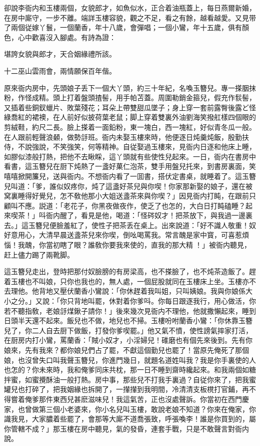 卻說李衙内和玉樓兩個，女貌郎才，如魚似水，正合着油瓶蓋上，每日燕爾新婚，在房中廝守，一步不離。端詳玉樓容貌，觀之不足，看之有餘，越看越愛。又見带了兩個従嫁丫鬟，一個蘭香，年十八歲，會彈唱；一個小鸞，年十五歲，俱有顏色，心中歡喜沒入腳處。有詩為證：

\begin{myquote}
堪誇女貌與郎才，天合姻緣禮所該。

十二巫山雲雨會，兩情願保百年偕。
\end{myquote}

原來衙内房中，先頭娘子丢下一個大丫頭，約三十年紀，名喚玉簪兒。專一搽胭抹粉，作怪成精。頭上打着盤頭揸髻，用手帕苫蓋。周圍勒銷金箍兒，假充作䯼髻，又插着些銅釵蠟片、敗葉殘花；耳朵上帶雙甜瓜墜子；身上穿一套前露臀後露ど怪綠喬紅的裙襖，在人前好似披荷葉老鼠；脚上穿着雙裏外油劉海笑撥舡樣四個眼的剪絨鞋，約尺二長。臉上搽着一面鉛粉，東一塊白，西一塊紅，好似青冬瓜一般。在人跟前輕聲浪顙，做勢㧱班。衙内未娶玉樓來時，他便逐日炖羹炖飯，殷勤扶侍，不說強說，不笑強笑，何等精神。自従娶過玉樓來，見衙内日逐和他床上睡，如膠似漆般打熱，把他不去瞅睬，這丫頭就有些使性兒起來。一日，衙内在書房中看書，這玉簪兒在厨下炖熱了一盞好菓仁泡茶，雙手用盤兒托來，到書房裏面，笑嘻嘻掀開簾兒，送與衙内。不想衙内看了一囬書，搭伏定書桌，就睡着了。這玉簪兒叫道：「爹，誰似奴疼你，炖了這盞好茶兒與你喫！你家那新娶的娘子，還在被窝裏睡得好覺兒，怎不敎他那小大姐送盞茶來與你喫？」因見衙内打盹，在跟前只顧叫不應。説道：「老花子，你黑夜做夜作，使乏了也怎的，大白日打盹磕睡？起來喫茶！」呌衙内醒了，看見是他，喝道：「怪硶奴才！把茶放下，與我過一邊裏去。」這玉簪兒便臉羞紅了，使性子把茶丢在桌上。出來說道：「好不識人敬重！奴好意用心，大清早晨送盞茶兒來你喫，倒吆喝罵我。常言醜是家中寳，可喜惹煩惱！我醜，你當初瞎了眼？誰敎你要我來使的，直我的那大精𣭈！」被衙内聽見，赶上儘力踢了兩靴脚。

這玉簪兒走出，登時把那付奴臉膀的有房梁高，也不搽臉了，也不炖茶造飯了。趕着玉樓也不叫娘，只你也我也的，無人處，一個屁股就同在玉樓床上坐。玉樓亦不去理他。他背地又壓伏蘭香小鸞說：「你休趕着我叫姐，只叫姨娘。我與你娘係大小之分。」又說：「你只背地叫罷，休對着你爹呌。你每日跟逐我行，用心做活，你若不聽指敎，老娘㧱煤鍬子請你！」後來幾次見衙内不理他，他就撒懶起來，睡到日頭半天還不起來。飯兒也不做，地兒也不掃。玉樓吩咐蘭香小鸞：「你休靠玉簪兒了，你二人自去厨下做飯，打發你爹喫罷。」他又氣不憤，使性謗氣摔家打活，在厨房内打小鸞，罵蘭香：「賊小奴才，小淫婦兒！碓磨也有個先來後到。先有你娘來，先有我來？都你娘兒們占了罷，不獻這個勤兒也罷了！當原先俺死了那個娘，也沒曾失口叫我聲玉簪兒，你進門幾日，就題名道姓叫我？我是你手裏使的人也怎的？你未來時，我和俺爹同床共枕，那一日不睡到齋時纔起來。和我兩個如糖拌蜜，如蜜攪酥油一般打熱。房中事，那些兒不打我手裏過？自従你來了，把我蜜罐兒也打碎了，把我姻緣也拆開了，一攆攆到我明間，冷清清支板櫈打官鋪，再不得嘗着俺爹那件東西兒甚麽滋味兒！我這氣苦，正也沒處聲訴。你當初在西門慶家，也曾做第三個小老婆來，你小名兒叫玉樓，敢說老娘不知道？你來在俺家，你識我見，大家膿着些罷了，會那等大廝不道喬張致，呼張喚李！誰是你買到的，屬你管轄不成？」那玉樓在房中聽見，氣的發昏，連套手戰，只是不敢聲言對衙内說。

